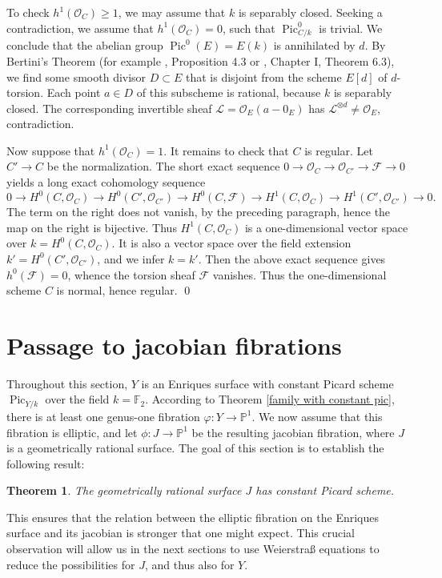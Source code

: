 \documentclass[oneside, 12pt]{amsart}
\newcommand\mylabel[1]{\label{#1}\marginpar{\vspace{-1ex}\medskip\medskip\footnotesize \tt #1}}
\renewcommand\mylabel[1]{\label{#1}}
\newtheorem{theorem}{Theorem}[section]
\theoremstyle{definition}
\theoremstyle{remark}
\newcommand{\FF}{\mathbb{F}}
\newcommand{\PP}{\mathbb{P}}
\newcommand{\shF}{\mathscr{F}}
\newcommand{\shL}{\mathscr{L}}
\renewcommand{\O}{\mathscr{O}}
\newcommand{\Pic}{\operatorname{Pic}}
\newcommand{\ra}{\rightarrow}
\begin{document}
To check $h^1(\O_C)\geq 1$, we may assume that $k$ is separably closed.
Seeking a contradiction, we assume that $h^1(\O_C)=0$, such that $\Pic^0_{C/k}$ is trivial.
We conclude that the abelian group $\Pic^0(E)=E(k)$ is annihilated by $d$.
By Bertini's Theorem (for example \cite{EGA V}, Proposition 4.3 or \cite{Jouanolou 1983}, Chapter I, Theorem 6.3), we find some smooth divisor $D\subset E$ that is disjoint
from the scheme $E[d]$ of $d$-torsion. Each point $a\in D$ of this subscheme is rational,
because $k$ is separably closed. The corresponding invertible sheaf $\shL=\O_E(a-0_E)$
 has $\shL^{\otimes d}\neq \O_E$, contradiction.

Now suppose that $h^1(\O_C)=1$. 
It remains to check that $C$ is regular.
Let $C'\ra C$ be the normalization. The short exact sequence $0\ra\O_C\ra\O_{C'}\ra\shF\ra 0$
yields a long exact cohomology sequence
$$
0\ra H^0(C,\O_C)\ra H^0(C',\O_{C'})\ra H^0(C,\shF)\ra H^1(C,\O_C)\ra H^1(C',\O_{C'})\ra 0.
$$
The term on the right does not vanish, by the preceding paragraph, hence the map on the right is bijective.
Thus $H^1(C,\O_C)$ is a one-dimensional  vector space over $k=H^0(C,\O_C)$. It is also a vector space over the field extension $k'=H^0(C',\O_{C'})$,
and we infer $k=k'$.
Then the above exact sequence   gives $h^0(\shF)=0$,   whence the torsion sheaf $\shF$ vanishes.
Thus the one-dimensional scheme $C$ is normal, hence regular.
\qed


\section{Passage to   jacobian   fibrations}
\mylabel{Passage to jacobian}

Throughout this section, $Y$ is an Enriques surface with constant Picard scheme $\Pic_{Y/k}$ over the field $k=\FF_2$.
According to Theorem \ref{family with constant pic}, 
there is at least one  genus-one fibration $\varphi:Y\ra\PP^1$. 
We now assume that this fibration is elliptic,  and let
$\phi:J\ra\PP^1$ be the resulting jacobian fibration, where $J$ is a  geometrically rational surface.
The goal of this section is to establish the following result:

\begin{theorem}
\mylabel{jacobian constant pic}
The geometrically rational surface $J$ has constant Picard scheme.
\end{theorem}

This ensures that the relation between the elliptic fibration on the Enriques surface
and its jacobian is stronger that one might expect. This crucial observation will allow us in the next sections
to use Weierstra\ss{} equations to reduce the possibilities for $J$, and thus   also for $Y$.
\end{document}
